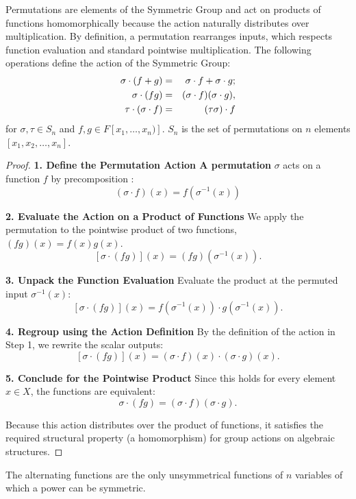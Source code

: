 \begin{theorem}
Permutations are elements of the Symmetric Group and act on products of functions homomorphically 
because the action naturally distributes over multiplication. 
By definition, a permutation rearranges inputs, which respects function evaluation and standard pointwise multiplication. 
The following operations define the action of the Symmetric Group:
\begin{eqnarray*}
\sigma \cdot (f + g) &=& \sigma\cdot f + \sigma\cdot g;\cr
\sigma\cdot(fg) &=& (\sigma\cdot f)(\sigma \cdot g),\cr
\tau\cdot (\sigma\cdot f) &=& (\tau\sigma)\cdot f
\end{eqnarray*}for $\sigma, \tau \in S_n$ and $f, g\in F[x_1,\hdots, x_n)]$.  $S_n$ is the set of permutations on $n$ elements $[x_1, x_2, \hdots, x_n]$.
\end{theorem}
\begin{proof} 

{\bf 1. Define the Permutation Action A permutation} $\sigma$ acts on a function $f$  by precomposition \cite{Cox}: \[ (\sigma \cdot f)(x) = f(\sigma^{-1}(x)) \] 

{\bf 2. Evaluate the Action on a Product of Functions} We apply the permutation  to the pointwise product of two functions, 
$(fg)(x) = f(x) g(x)$. \[ [\sigma\cdot (fg)](x) = (fg)(\sigma^{-1}(x)).\]

{\bf 3. Unpack the Function Evaluation} Evaluate the product at the permuted input $\sigma^{-1}(x)$:
\[ [\sigma\cdot (fg)](x) = f(\sigma^{-1}(x)) \cdot g(\sigma^{-1}(x)).\]

{\bf 4. Regroup using the Action Definition} By the definition of the action in Step 1, we rewrite the scalar outputs:
\[ [\sigma\cdot (fg)](x) = (\sigma\cdot f)(x) \cdot (\sigma \cdot g)(x).\]

{\bf 5. Conclude for the Pointwise Product} Since this holds for every element $x\in X$, the functions are equivalent:
\[ \sigma\cdot(fg) = (\sigma\cdot f)(\sigma \cdot g).\]

Because this action distributes over the product of functions, it satisfies the required structural property (a homomorphism) for group actions on algebraic structures.
\end{proof}

\begin{theorem}
The alternating functions are the only unsymmetrical functions of $n$ variables of which a power can be symmetric.
\end{theorem}

